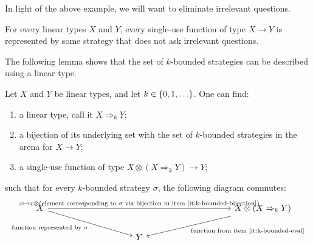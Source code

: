 In light of the above example, we will want to eliminate irrelevant questions. 

\begin{lemma}\label{lem:eliminate-irrelevant-questions}
    For every linear types $X$ and $Y$, every single-use function of type  $X \to Y$ is represented by  some strategy that does not ask irrelevant questions.
\end{lemma}


The following lemma shows that the set of $k$-bounded strategies can be described using a linear type.

\begin{lemma}\label{lem:linear-type-of-k-bounded-strategies}
    Let $X$ and $Y$ be linear types, and let $k \in \{0,1,\ldots\}$. One can find: 
    \begin{enumerate}
        \item \label{it:k-bounded-type} a linear type, call it $X \Rightarrow_k Y$;
        \item \label{it:k-bounded-bijection} a bijection of its underlying set with the set of $k$-bounded strategies in the arena for $X \to Y$;
        \item \label{it:k-bounded-eval} a single-use function of type $X \otimes (X \Rightarrow_k Y) \to Y$;\end{enumerate}
    such that for every $k$-bounded strategy $\sigma$, the following diagram commutes:
    \[
    \begin{tikzcd}[column sep=3.5cm]
    X  
    \ar[rr,"{x \mapsto x \otimes \text{(element corresponding to $\sigma$ via bijection in item~\ref{it:k-bounded-bijection}})}"]
    \ar[dr,"{\text{function represented by $\sigma$}}"']
    & & 
    X \otimes (X \Rightarrow_k Y)
    \ar[dl,"\text{function from item~\ref{it:k-bounded-eval}}"]
    \\
    & Y
    \end{tikzcd}
    \]    
\end{lemma}




